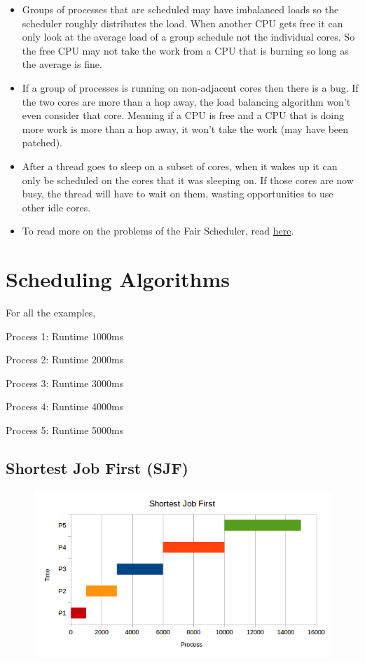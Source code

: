 \begin{aside}
\begin{itemize}
\tightlist
\item
  Groups of processes that are scheduled may have imbalanced loads so the scheduler roughly distributes the load. When another CPU gets free it can only look at the average load of a group schedule not the individual cores. So the free CPU may not take the work from a CPU that is burning so long as the average is fine.
\item
  If a group of processes is running on non-adjacent cores then there is a bug. If the two cores are more than a hop away, the load balancing algorithm won't even consider that core. Meaning if a CPU is free and a CPU that is doing more work is more than a hop away, it won't take the work (may have been patched).
\item
  After a thread goes to sleep on a subset of cores, when it wakes up it can only be scheduled on the cores that it was sleeping on. If those cores are now busy, the thread will have to wait on them, wasting opportunities to use other idle cores.
\item
  To read more on the problems of the Fair Scheduler, read \href{https://blog.acolyer.org/2016/04/26/the-linux-scheduler-a-decade-of-wasted-cores}{here}.
\end{itemize}

\end{aside}

\section{Scheduling Algorithms}

For all the examples,

Process 1: Runtime 1000ms

Process 2: Runtime 2000ms

Process 3: Runtime 3000ms

Process 4: Runtime 4000ms

Process 5: Runtime 5000ms

\subsection{Shortest Job First (SJF)}

\begin{figure}[htbp]
\centering
\includegraphics[width=\textwidth]{scheduling/images/sjf.png}
\caption{}
\end{figure}

